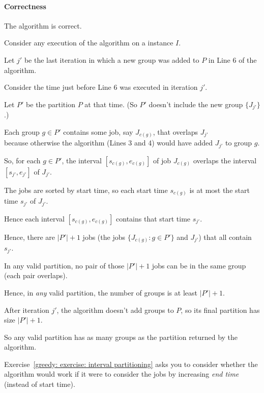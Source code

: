 \paragraph{Correctness}
\begin{lemma}
  The algorithm is correct.
\end{lemma}
\begin{longFormProof}
  \step Consider any execution of the algorithm on a  instance $I$.  

  \step Let $j'$ be the last iteration in which a new group was added to $P$ in Line 6 of the algorithm.

  \step Consider the time just before Line 6 was executed in iteration $j'$.

  \step Let $P'$ be the partition $P$ at that time.  (So $P'$ doesn't include the new group $\{J_{j'}\}$.)

  \step Each group $g\in P'$ contains some job, say $J_{c(g)}$, that overlaps $J_{j'}$
  \\ because otherwise the algorithm (Lines 3 and 4) would have added $J_{j'}$ to group $g$.

  \step So, for each $g\in P'$, the interval $[s_{c(g)}, e_{c(g)}]$ of job $J_{c(g)}$ overlaps the interval $[s_{j'}, e_{j'}]$ of $J_{j'}$.

  \step The jobs are sorted by start time, so each start time $s_{c(g)}$ is at most the start time $s_{j'}$ of $J_{j'}$.

  \step Hence each interval $[s_{c(g)}, e_{c(g)}]$ contains that start time $s_{j'}$.

  \step Hence, there are $|P'|+1$ jobs (the jobs $\{J_{c(g)} : g\in P'\}$ and $J_{j'}$) that all contain $s_{j'}$.

  \step In any valid partition, no pair of those $|P'|+1$ jobs can be in the same group (each pair overlaps).

  \step Hence, in \emph{any} valid partition, the number of groups is at least $|P'|+1$.

  \step After iteration $j'$, the algorithm doesn't add groups to $P$, so its final partition has size $|P'|+1$.

  \step So any valid partition has as many groups as the partition returned by the algorithm.
\end{longFormProof}

Exercise~\ref{greedy: exercise: interval partitioning} %
asks you to consider whether the algorithm would work
if it were to consider the jobs by increasing \emph{end time} (instead of start time).

